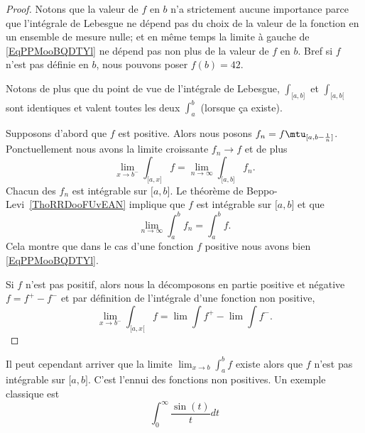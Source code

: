 \begin{proof}
    Notons que la valeur de \( f\) en \( b\) n'a strictement aucune importance parce que l'intégrale de Lebesgue ne dépend pas du choix de la valeur de la fonction en un ensemble de mesure nulle; et en même temps la limite à gauche de \eqref{EqPPMooBQDTYl} ne dépend pas non plus de la valeur de \( f\) en \( b\). Bref si \( f\) n'est pas définie en \( b\), nous pouvons poser \( f(b)=42\).

    Notons de plus que du point de vue de l'intégrale de Lebesgue, \( \int_{\mathopen[ a , b \mathclose]}\) et \( \int_{\mathopen[ a , b [}\) sont identiques et valent toutes les deux \( \int_a^b\) (lorsque ça existe).

    Supposons d'abord que \( f\) est positive. Alors nous posons \( f_n=f\mtu_{\mathopen[ a , b-\frac{1}{ n } \mathclose]}\). Ponctuellement nous avons la limite croissante \( f_n\to f\) et de plus
    \begin{equation}
        \lim_{x\to b^-} \int_{\mathopen[ a , x \mathclose]}f=\lim_{n\to \infty} \int_{\mathopen[ a , b \mathclose]}f_n.
    \end{equation}
    Chacun des \( f_n\) est intégrable sur \( \mathopen[ a , b \mathclose]\). Le théorème de Beppo-Levi~\ref{ThoRRDooFUvEAN} implique que \( f\) est intégrable sur \( \mathopen[ a , b \mathclose]\) et que
    \begin{equation}
        \lim_{n\to \infty} \int_a^bf_n=\int_a^bf.
    \end{equation}
    Cela montre que dans le cas d'une fonction \( f\) positive nous avons bien \eqref{EqPPMooBQDTYl}.

    Si \( f\) n'est pas positif, alors nous la décomposons en partie positive et négative \( f=f^+-f^{-}\) et par définition de l'intégrale d'une fonction non positive,
    \begin{equation}
        \lim_{x\to b^-} \int_{\mathopen[ a , x [}f=\lim\int f^{+}-\lim\int f^-.
    \end{equation}
\end{proof}

Il peut cependant arriver que la limite \( \lim_{x\to b} \int_a^bf\) existe alors que \( f\) n'est pas intégrable sur \( \mathopen[ a , b \mathclose]\). C'est l'ennui des fonctions non positives. Un exemple classique est
\begin{equation}\label{EqMMVooDSpgfz}
    \int_0^{\infty}\frac{ \sin(t) }{ t }dt
\end{equation}

